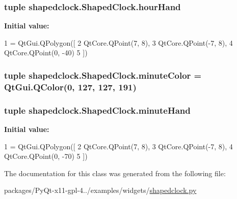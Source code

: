 \subsubsection[{hour\+Hand}]{\setlength{\rightskip}{0pt plus 5cm}tuple shapedclock.\+Shaped\+Clock.\+hour\+Hand\hspace{0.3cm}{\ttfamily [static]}}\label{classshapedclock_1_1ShapedClock_af10385c012043f4cbcf9d76c94d14e4d}
{\bfseries Initial value\+:}
\begin{DoxyCode}
1 = QtGui.QPolygon([
2         QtCore.QPoint(7, 8),
3         QtCore.QPoint(-7, 8),
4         QtCore.QPoint(0, -40)
5     ])
\end{DoxyCode}
\hypertarget{classshapedclock_1_1ShapedClock_af4a1fea2880b0daec2d1362ee1d831d6}{}
\subsubsection[{minute\+Color}]{\setlength{\rightskip}{0pt plus 5cm}tuple shapedclock.\+Shaped\+Clock.\+minute\+Color = Qt\+Gui.\+Q\+Color(0, 127, 127, 191)\hspace{0.3cm}{\ttfamily [static]}}\label{classshapedclock_1_1ShapedClock_af4a1fea2880b0daec2d1362ee1d831d6}
\hypertarget{classshapedclock_1_1ShapedClock_a425ed6da399183dc25c9c3ff47c3b006}{}
\subsubsection[{minute\+Hand}]{\setlength{\rightskip}{0pt plus 5cm}tuple shapedclock.\+Shaped\+Clock.\+minute\+Hand\hspace{0.3cm}{\ttfamily [static]}}\label{classshapedclock_1_1ShapedClock_a425ed6da399183dc25c9c3ff47c3b006}
{\bfseries Initial value\+:}
\begin{DoxyCode}
1 = QtGui.QPolygon([
2         QtCore.QPoint(7, 8),
3         QtCore.QPoint(-7, 8),
4         QtCore.QPoint(0, -70)
5     ])
\end{DoxyCode}


The documentation for this class was generated from the following file\+:\begin{DoxyCompactItemize}
\item 
packages/\+Py\+Qt-\/x11-\/gpl-\/4../examples/widgets/\hyperlink{shapedclock_8py}{shapedclock.\+py}\end{DoxyCompactItemize}
